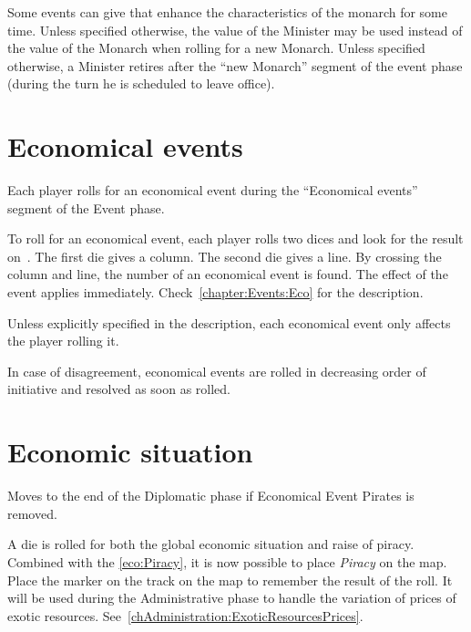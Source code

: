 
\label{chEvents:Excellent Ministers} Some
events can give  that enhance the
characteristics of the monarch for some time.
\bparag Unless specified otherwise, the value of the Minister may be
used instead of the value of the Monarch when rolling for a new Monarch.
\bparag Unless specified otherwise, a Minister retires after the ``new
Monarch'' segment of the event phase (during the turn he is scheduled to
leave office).




\section{Economical events}\label{chEvents:eco-events}

\aparag Each player rolls for an economical event during the
``Economical events'' segment of the Event phase.

\aparag To roll for an economical event, each player rolls two dices and
look for the result on~.
\bparag The first die gives a column. The second die gives a line. By
crossing the column and line, the number of an economical event is
found.
\bparag The effect of the event applies
immediately. Check~\ref{chapter:Events:Eco} for the description.

\aparag Unless explicitly specified in the description, each economical
event only affects the player rolling it.

\aparag In case of disagreement, economical events are rolled in
decreasing order of initiative and resolved as soon as rolled.


\section{Economic situation}
\label{chEvents:Economic situation}

\begin{todo}
  [TBD] Moves to the end of the Diplomatic phase if Economical Event
  Pirates is removed.
\end{todo}

 A die is rolled for both the global economic
situation and raise of piracy.
\bparag Combined with the \ref{eco:Piracy}, it is now possible to place
\emph{Piracy} on the map.
\bparag Place the  marker on the track on the
\ROTW map to remember the result of the roll. It will be used during the
Administrative phase to handle the variation of prices of exotic
resources. See~\ref{chAdministration:ExoticResourcesPrices}.

